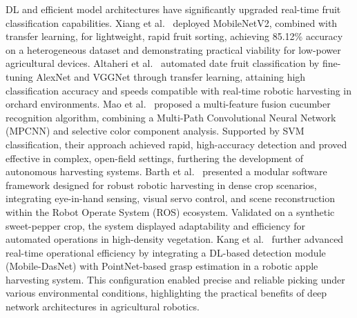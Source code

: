 \documentclass[a4paper,fleqn]{cas-dc}
\begin{document}
DL and efficient model architectures have significantly upgraded real-time fruit classification capabilities. Xiang et al.~\cite{xiang2019fruit} deployed MobileNetV2, combined with transfer learning, for lightweight, rapid fruit sorting, achieving 85.12\% accuracy on a heterogeneous dataset and demonstrating practical viability for low-power agricultural devices. Altaheri et al.~\cite{altaheri2019date} automated date fruit classification by fine-tuning AlexNet and VGGNet through transfer learning, attaining high classification accuracy and speeds compatible with real-time robotic harvesting in orchard environments.
Mao et al.~\cite{mao2020automatic} proposed a multi-feature fusion cucumber recognition algorithm, combining a Multi-Path Convolutional Neural Network (MPCNN) and selective color component analysis. Supported by SVM classification, their approach achieved rapid, high-accuracy detection and proved effective in complex, open-field settings, furthering the development of autonomous harvesting systems.
Barth et al.~\cite{barth2016design} presented a modular software framework designed for robust robotic harvesting in dense crop scenarios, integrating eye-in-hand sensing, visual servo control, and scene reconstruction within the Robot Operate System (ROS) ecosystem. Validated on a synthetic sweet-pepper crop, the system displayed adaptability and efficiency for automated operations in high-density vegetation.
Kang et al.~\cite{kang2020real} further advanced real-time operational efficiency by integrating a DL-based detection module (Mobile-DasNet) with PointNet-based grasp estimation in a robotic apple harvesting system. This configuration enabled precise and reliable picking under various environmental conditions, highlighting the practical benefits of deep network architectures in agricultural robotics.
\end{document}
